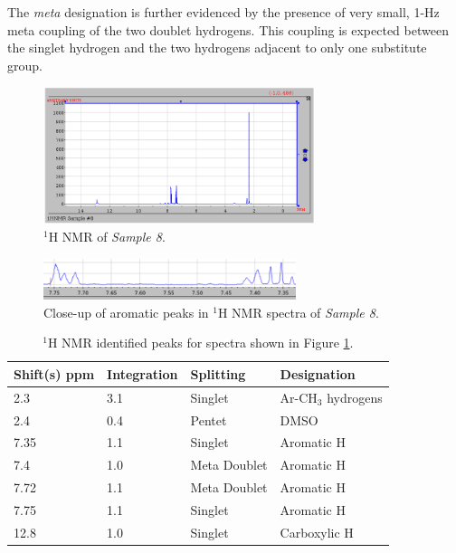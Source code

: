 \documentclass[8.5pt,twoside,twocolumn]{article}
\begin{document}
The \textit{meta} designation is further evidenced by the presence of very small, 1-Hz meta coupling of the two doublet hydrogens. This coupling is expected between the singlet hydrogen and the two hydrogens adjacent to only one substitute group.\\

\begin{figure}[h]
\centering
  \includegraphics[height=4cm]{figures/HNMR.png}
  \caption{$^{1}$H NMR of \textit{Sample 8}.}
  \label{fig:HNMR}
\end{figure}

\begin{figure}[h]
\centering
  \includegraphics[height=1.2cm]{figures/HNMR-splitting.png}
  \caption{Close-up of aromatic peaks in $^{1}$H NMR spectra of \textit{Sample 8}.}
  \label{fig:HNMR-closeup}
\end{figure}

\begin{table}[h]
\small
  \caption{$^{1}$H NMR identified peaks for spectra shown in Figure \ref{fig:HNMR}.}
  \label{table:HNMR}
  \begin{tabular*}{0.5\textwidth}{@{\extracolsep{\fill}}llll}
    \hline
    Shift(s) ppm & Integration & Splitting & Designation \\
    \hline
    2.3 & 3.1 & Singlet & Ar-CH$_3$ hydrogens\\
    2.4 & 0.4 & Pentet & DMSO\\
    7.35 & 1.1 & Singlet & Aromatic H\\
    7.4 & 1.0 &  Meta Doublet & Aromatic H\\
    7.72 & 1.1 & Meta Doublet & Aromatic H\\
    7.75 & 1.1 & Singlet & Aromatic H\\
    12.8 & 1.0 & Singlet & Carboxylic H\\
    \hline
  \end{tabular*}
\end{table}
\end{document}
